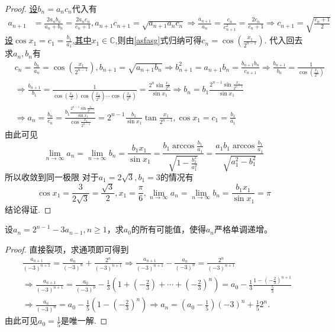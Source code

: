 \documentclass[../../main.tex]{subfiles}%
\begin{document}
\begin{proof}

\hyperlink{比值换元的问题}{设\(b_n = a_nc_n\)}代入有
\begin{align}
a_{n + 1}&=\frac{2a_nb_n}{a_n + b_n}=\frac{2a_nc_n}{c_n + 1},a_{n + 1}c_{n + 1}=\sqrt{a_{n + 1}a_nc_n}\Rightarrow\frac{a_{n + 1}}{a_n}=\frac{c_n}{c_{n + 1}^2}=\frac{2c_n}{c_n + 1}\Rightarrow c_{n + 1}=\sqrt{\frac{c_n + 1}{2}}\label{asfasg}
\end{align}
\hyperlink{三角换元的问题}{设\(\cos x_1 = c_1=\frac{b_1}{a_1}\),其中$x_1\in \mathbb{C}$},则由\eqref{asfasg}式归纳可得$c_n=\cos \left( \frac{x_1}{2^{n-1}} \right)$.
代入回去求\(a_n,b_n\)有
\begin{align*}
&c_n=\frac{b_n}{a_n}=\cos\left(\frac{x_1}{2^{n - 1}}\right),b_{n + 1}=\sqrt{a_{n + 1}b_n}\Rightarrow b_{n + 1}^2=a_{n + 1}b_n=\frac{b_{n + 1}b_n}{c_{n + 1}}\Rightarrow\frac{b_{n + 1}}{b_n}=\frac{1}{\cos\left(\frac{x_1}{2^{n}}\right)}\\
&\Rightarrow \frac{b_{n + 1}}{b_1}=\frac{1}{\cos\left(\frac{x_1}{2}\right)\cos\left(\frac{x_1}{2^2}\right)\cdots\cos\left(\frac{x_1}{2^n}\right)}=\frac{2^n\sin\frac{x_1}{2^n}}{\sin x_1}\Rightarrow b_n = b_1\frac{2^{n - 1}\sin\frac{x_1}{2^{n - 1}}}{\sin x_1}\\
&\Rightarrow a_n=\frac{b_n}{c_n}=\frac{b_1\frac{2^{n - 1}\sin\frac{x_1}{2^{n - 1}}}{\sin x_1}}{\cos\frac{x_1}{2^{n - 1}}}=2^{n - 1}\frac{b_1}{\sin x_1}\tan\frac{x_1}{2^{n - 1}},\cos x_1 = c_1=\frac{b_1}{a_1}
\end{align*}
由此可见
\[
\lim_{n\rightarrow\infty}a_n=\lim_{n\rightarrow\infty}b_n=\frac{b_1x_1}{\sin x_1}=\frac{b_1\arccos\frac{b_1}{a_1}}{\sqrt{1 - \frac{b_1^2}{a_1^2}}}=\frac{a_1b_1\arccos\frac{b_1}{a_1}}{\sqrt{a_1^2 - b_1^2}}
\]
所以收敛到同一极限
对于\(a_1 = 2\sqrt{3},b_1 = 3\)的情况有
\[
\cos x_1=\frac{3}{2\sqrt{3}}=\frac{\sqrt{3}}{2},x_1=\frac{\pi}{6},\lim_{n\rightarrow\infty}a_n=\lim_{n\rightarrow\infty}b_n=\frac{b_1x_1}{\sin x_1}=\pi
\]
结论得证.

\end{proof}

\begin{example}
设\(a_n = 2^{n - 1}-3a_{n - 1},n\geqslant 1\)，求\(a_0\)的所有可能值，使得\(a_n\)严格单调递增。
\end{example}
\begin{proof}

直接裂项，求通项即可得到
\begin{align*}
&\frac{a_{n+1}}{(-3)^{n+1}}=\frac{a_n}{(-3)^n}+\frac{2^n}{(-3)^{n+1}}\Rightarrow \frac{a_{n+1}}{(-3)^{n+1}}-\frac{a_n}{(-3)^n}=\frac{2^n}{(-3)^{n+1}}
\\
&\Rightarrow \frac{a_{n+1}}{(-3)^{n+1}}=\frac{a_0}{(-3)^0}-\frac{1}{3}\left( 1+\left( -\frac{2}{3} \right) +\cdots +\left( -\frac{2}{3} \right) ^n \right) =a_0-\frac{1}{3}\frac{1-\left( -\frac{2}{3} \right) ^{n+1}}{\frac{5}{3}}
\\
&\Rightarrow \frac{a_n}{(-3)^n}=a_0-\frac{1}{5}\left( 1-\left( -\frac{2}{3} \right) ^n \right) \Rightarrow a_n=\left( a_0-\frac{1}{5} \right) (-3)^n+\frac{1}{5}2^n.
\end{align*}
由此可见\(a_0 = \frac{1}{5}\)是唯一解.

\end{proof}
\end{document}
